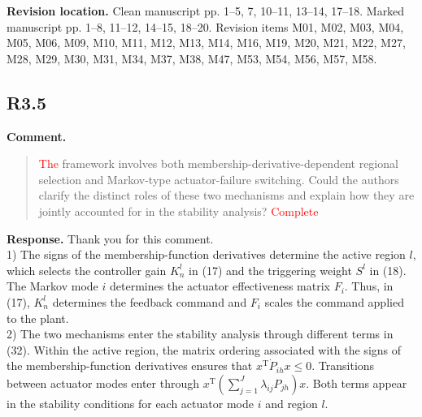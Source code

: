 \documentclass[12pt,a4paper]{article}
\begin{document}
\textbf{Revision location.} Clean manuscript pp. 1–5, 7, 10–11, 13–14, 17–18. Marked manuscript pp. 1–8, 11–12, 14–15, 18–20. Revision items M01, M02, M03, M04, M05, M06, M09, M10, M11, M12, M13, M14, M16, M19, M20, M21, M22, M27, M28, M29, M30, M31, M34, M37, M38, M47, M53, M54, M56, M57, M58.

\subsection*{R3.5}

\textbf{Comment.}
\begin{quote}
\raggedright
\textcolor{red}{The} framework involves both membership-derivative-dependent regional selection and Markov-type actuator-failure switching. Could the authors clarify the distinct roles of these two mechanisms and explain how they are jointly accounted for in the stability analysis? \textcolor{red}{Complete}
\end{quote}

\textbf{Response.}
Thank you for this comment.\\

1) The signs of the membership-function derivatives determine the active region $l$, which selects the controller gain $K_n^l$ in (17) and the triggering weight $S^l$ in (18). The Markov mode $i$ determines the actuator effectiveness matrix $F_i$. Thus, in (17), $K_n^l$ determines the feedback command and $F_i$ scales the command applied to the plant.\\

2) The two mechanisms enter the stability analysis through different terms in (32). Within the active region, the matrix ordering associated with the signs of the membership-function derivatives ensures that $x^{\mathrm T}\dot P_{ih}x\leq 0$. Transitions between actuator modes enter through $x^{\mathrm T}(\sum_{j=1}^{J}\lambda_{ij}P_{jh})x$. Both terms appear in the stability conditions for each actuator mode $i$ and region $l$.

%
%
\end{document}
